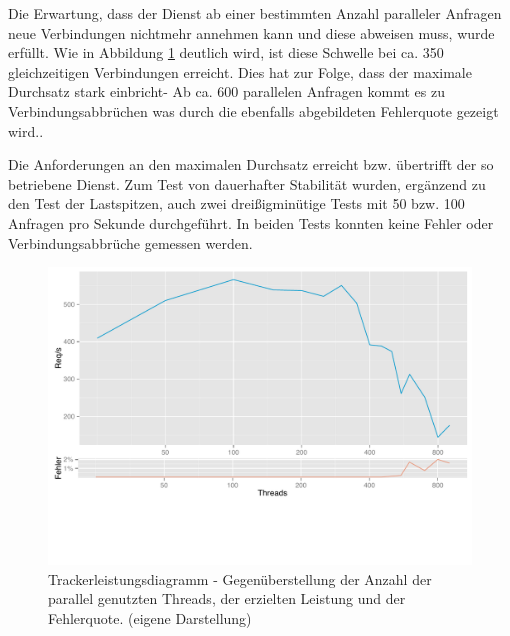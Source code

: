 Die Erwartung, dass der Dienst ab einer bestimmten Anzahl paralleler Anfragen neue Verbindungen nichtmehr annehmen kann und diese abweisen muss, wurde erfüllt. Wie in Abbildung \ref{fig:chart_tracker} deutlich wird, ist diese Schwelle bei ca. 350 gleichzeitigen Verbindungen erreicht. Dies hat zur Folge, dass der maximale Durchsatz stark einbricht- Ab ca. 600 parallelen Anfragen kommt es zu Verbindungsabbrüchen was durch die ebenfalls abgebildeten Fehlerquote gezeigt wird..

Die Anforderungen an den maximalen Durchsatz erreicht bzw. übertrifft der so betriebene Dienst. Zum Test von dauerhafter Stabilität wurden, ergänzend zu den Test der Lastspitzen, auch zwei dreißigminütige Tests mit  50 bzw. 100 Anfragen pro Sekunde durchgeführt. In beiden Tests konnten keine Fehler oder Verbindungsabbrüche gemessen werden.

\begin{figure}[htb]
  \centering
    \includegraphics[width=\textwidth]{Abbildungen/tracker.pdf}
    \caption[Leistung Tracker]{Trackerleistungsdiagramm - Gegenüberstellung der Anzahl der parallel genutzten Threads, der erzielten Leistung und der Fehlerquote. { \scriptsize (eigene Darstellung)}}
    \label{fig:chart_tracker}
\end{figure}

